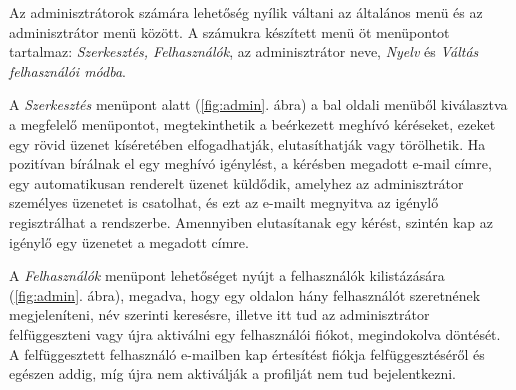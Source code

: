 Az adminisztrátorok számára lehetőség nyílik váltani az általános menü és az adminisztrátor menü között. A számukra készített menü öt menüpontot tartalmaz: \textit{Szerkesztés, Felhasználók}, az adminisztrátor neve, \textit{Nyelv} és \textit{Váltás felhasználói módba}.

A \textit{Szerkesztés} menüpont alatt (\ref{fig:admin}. ábra) a bal oldali menüből kiválasztva a megfelelő menüpontot, megtekinthetik a beérkezett meghívó kéréseket, ezeket egy rövid üzenet kíséretében elfogadhatják, elutasíthatják vagy törölhetik. Ha pozitívan bírálnak el egy meghívó igénylést, a kérésben megadott e-mail címre, egy automatikusan renderelt üzenet küldődik, amelyhez az adminisztrátor személyes üzenetet is csatolhat, és ezt az e-mailt megnyitva az igénylő regisztrálhat a rendszerbe. Amennyiben elutasítanak egy kérést, szintén kap az igénylő egy üzenetet a megadott címre.

A \textit{Felhasználók} menüpont lehetőséget nyújt a felhasználók kilistázására (\ref{fig:admin}. ábra), megadva, hogy egy oldalon hány felhasználót szeretnének megjeleníteni, név szerinti keresésre, illetve itt tud az adminisztrátor felfüggeszteni vagy újra aktiválni egy felhasználói fiókot, megindokolva döntését. A felfüggesztett felhasználó e-mailben kap értesítést fiókja felfüggesztéséről és egészen addig, míg újra nem aktiválják a profilját nem tud bejelentkezni.


